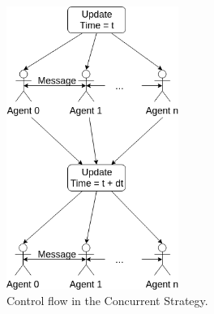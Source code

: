 \begin{figure}[H]
	\centering
	\includegraphics[width=0.5\textwidth, angle=0]{./fig/implabs/concurrent.png}
	\caption{Control flow in the Concurrent Strategy.}
	\label{fig:strategy_conc}
\end{figure}


